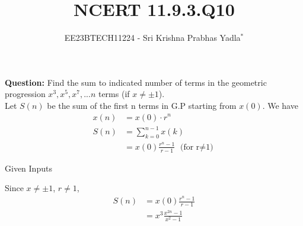 \documentclass[journal,12pt,twocolumn]{IEEEtran}
\theoremstyle{remark}
\begin{document}

\vspace{3cm}

\title{NCERT 11.9.3.Q10}
\author{EE23BTECH11224 - Sri Krishna Prabhas Yadla$^{*}$%
}
\maketitle
\newpage
\bigskip

\renewcommand{\thefigure}{\theenumi}
\renewcommand{\thetable}{\theenumi}


\vspace{3cm}
\textbf{Question:} Find the sum to indicated number of terms in the geometric progression \(x^3,x^5,x^7,...n\) terms (if \(x\neq\pm1\)).
\\
\solution
Let $S(n)$ be the sum of the first n terms in G.P starting from $x(0)$. We have
\begin{align}
    x(n) &= x(0) \cdot r^n \\
    S(n) &= \sum_{k=0}^{n-1}x(k) \\
    &= x(0) \frac{r^n-1}{r-1} \text{    (for r$\neq$1)}
\end{align}
\begin{table}[!ht]
   
   \label{tab:table1}
   \caption{Given Inputs}
\end{table}
\newline
Since $x\neq\pm1$, $r\neq1$,
\begin{align}
    S(n) &= x(0) \frac{r^n-1}{r-1} \\
    &= x^3 \frac{x^{2n}-1}{x^2-1}
\end{align}
\end{document}
